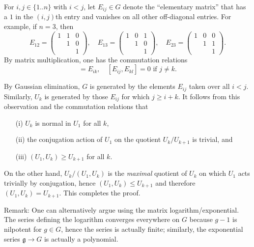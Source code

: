 \documentclass[reqno]{amsart} 
\begin{document}
\begin{itemize}
  For $i, j \in \{1..n\}$ with $i < j$,
  let $E_{i j} \in G$
  denote the ``elementary matrix'' that has a $1$ in the $(i,j)$th entry
  and vanishes
  on all other off-diagonal entries.
  For example, if $n = 3$,
  then
  \begin{equation*}
  E_{12}
  = 
\begin{pmatrix}
    1 & 1 & 0 \\
    & 1 & 0 \\
    &  & 1
  \end{pmatrix}
,
  \quad 
  E_{13}
  = 
\begin{pmatrix}
    1 & 0  & 1 \\
    & 1 & 0 \\
    &  & 1
  \end{pmatrix}
,
  \quad 
  E_{23}
  = 
\begin{pmatrix}
    1 & 0  & 0 \\
    & 1 & 1 \\
    &  & 1
  \end{pmatrix}
.
  \end{equation*}
  By matrix multiplication, one has the commutation relations
  \begin{equation*}
  [E_{i j}, E_{j k}] = E_{i k},
  \quad
  [E_{ij},E_{k l}] = 0 \text{ if } j \neq k.
  \end{equation*}

  By Gaussian elimination, $G$ is generated by the elements
  $E_{i j}$ taken over all $i < j$.  Similarly, $U_k$ is
  generated by those $E_{i j}$ for which $j \geq i + k$.  It
  follows from this observation and the commutation relations
  that
  \begin{enumerate}
  \item[(i)]
    $U_k$ is normal in $U_1$ for all $k$,
  \item[(ii)]
    the conjugation action of $U_1$ on the quotient $U_k / U_{k+1}$ is
    trivial,
    and
  \item [(iii)]
    $(U_1,U_k) \geq U_{k+1}$ for all $k$.
  \end{enumerate}
  On the other hand,
  $U_k / (U_1,U_k)$ is the \emph{maximal} quotient of $U_k$ on
  which $U_1$ acts trivially by conjugation,
  hence
  $(U_1,U_k) \leq U_{k+1}$
  and
  therefore $(U_1,U_k) = U_{k+1}$.
  This completes the proof.

  Remark:
  One can alternatively argue using the matrix
  logarithm/exponential.
  The series defining the logarithm converges
  everywhere on $G$ because $g-1$ is nilpotent for $g \in G$,
  hence the series is actually finite;
  similarly, the exponential series
  $\mathfrak{g} \rightarrow G$ is actually a polynomial.


\end{itemize}
\end{document}
